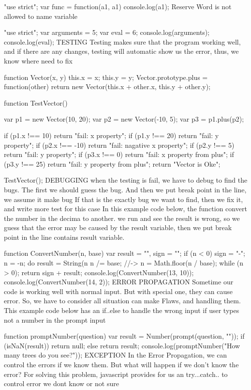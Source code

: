 "use strict";
var func = function(a1, a1){
    console.log(a1);
}
Reserve Word is not allowed to name variable

"use strict";
var arguments = 5;
var eval = 6;
console.log(arguments);
console.log(eval);
TESTING
Testing makes sure that the program working well, and if there are any changes, testing will automatic show us the error, thus, we know where need to fix

function Vector(x, y){
    this.x = x;
    this.y = y;
}
Vector.prototype.plus = function(other){
    return new Vector(this.x + other.x, this.y + other.y);
}

function TestVector(){
    var p1 = new Vector(10, 20);
    var p2 = new Vector(-10, 5);
    var p3 = p1.plus(p2);

    if (p1.x !== 10) return "fail: x property";
    if (p1.y !== 20) return "fail: y property";
    if (p2.x !== -10) return "fail: nagative x property";
    if (p2.y !== 5) return "fail: y property";
    if (p3.x !== 0) return "fail: x property from plus";
    if (p3.y !== 25) return "fail: y property from plus";
    return "Vector is Oke";
}
TestVector();
DEBUGGING
when the testing is fail, we have to debug to find the bugs.
The first we should guess the bug. And then we put break point in the line, we assume it make bug
If that is the exactly bug we want to find, then we fix it, and write more test for this case
In this example code below, the function convert the number in the decima to another. we run and see the result is wrong, so we guess that the error may be caused by the result variable, then we put break point in the line contains result variable.

function ConvertNumber(n, base) {
  var result = "", sign = "";
  if (n < 0) {
    sign = "-";
    n = -n;
  }
  do {
    result = String(n %
    n /= base; //-> n = Math.floor(n / base);
  } while (n > 0);
  return sign + result;
}
console.log(ConvertNumber(13, 10));
console.log(ConvertNumber(14, 2));
ERROR PROPAGATION
Sometime our code is working well with normal input. But with special one, they can cause error. So, we have to consider all situation can make Flaws, and handling them.
This example code below has an if..else to handle the wrong input if user types not a number in the prompt input

function promptNumber(question) {
  var result = Number(prompt(question, ""));
  if (isNaN(result)) return null;
  else return result;
}
console.log(promptNumber("How many trees do you see?"));
EXCEPTION
In the Error Propagation, we can control the errors if we know them. But what will happen if we don't know the error? For solving this problem, javascript provides for us an try...catch.. to control error we dont know or not sure

